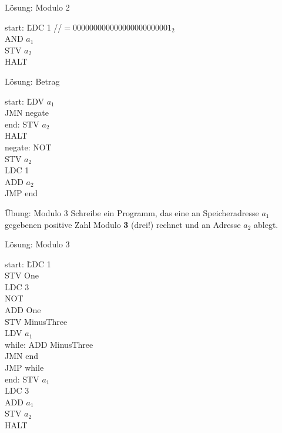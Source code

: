 \begin{frame}{Lösung: Modulo 2}
	\begin{tabbing}
		start: \; \= LDC 1 \quad  //$= 000000000000000000000001_2$ \\
				\> AND $a_1$ \\
				\> STV $a_2$ \\
				\> HALT
	\end{tabbing}
\end{frame}

\begin{frame}{Lösung: Betrag}
	\begin{tabbing}
		start: \quad \= LDV $a_1$ \\
					 \> JMN negate \\
		end: 		 \> STV $a_2$ \\
					 \> HALT \\
		negate:		 \> NOT \\
					 \> STV $a_2$ \\
					 \> LDC 1 \\
					 \> ADD $a_2$  \\
					 \> JMP end	 \\		 
	\end{tabbing}
\end{frame}

\begin{frame}{Übung: Modulo 3}
	Schreibe ein Programm, das eine an Speicheradresse $a_1$ gegebenen positive Zahl Modulo \textbf{3} (drei!) rechnet und an Adresse $a_2$ ablegt.
\end{frame}

\begin{frame}{Lösung: Modulo 3}
  \begin{tabbing}
    start: \quad \= LDC 1 \\
           \> STV One\\
           \> LDC 3\\
           \> NOT\\
           \> ADD One\\
           \> STV MinusThree\\
           \> LDV $a_1$\\
    \medskip
    while: \> ADD MinusThree\\
           \> JMN end\\
           \> JMP while\\
    \medskip
    end:   \> STV $a_1$\\
           \> LDC 3\\
           \> ADD $a_1$\\
           \> STV $a_2$ \\
           \> HALT\\
  \end{tabbing}
\end{frame}